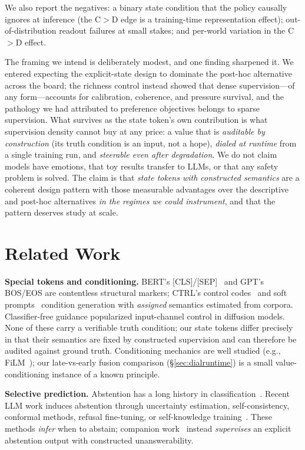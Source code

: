 \documentclass[11pt]{article}
\begin{document}
We also report the negatives: a binary state condition that the policy causally ignores at inference (the C$>$D edge is a training-time representation effect); out-of-distribution readout failures at small stakes; and per-world variation in the C$>$D effect.

The framing we intend is deliberately modest, and one finding sharpened it. We entered expecting the explicit-state design to dominate the post-hoc alternative across the board; the richness control instead showed that dense supervision---of any form---accounts for calibration, coherence, and pressure survival, and the pathology we had attributed to preference objectives belongs to sparse supervision. What survives as the state token's own contribution is what supervision density cannot buy at any price: a value that is \emph{auditable by construction} (its truth condition is an input, not a hope), \emph{dialed at runtime} from a single training run, and \emph{steerable even after degradation}. We do not claim models have emotions, that toy results transfer to LLMs, or that any safety problem is solved. The claim is that \emph{state tokens with constructed semantics} are a coherent design pattern with those measurable advantages over the descriptive and post-hoc alternatives \emph{in the regimes we could instrument}, and that the pattern deserves study at scale.

\section{Related Work}
\label{sec:related}

\textbf{Special tokens and conditioning.} BERT's [CLS]/[SEP]~\cite{devlin2019bert} and GPT's BOS/EOS are contentless structural markers; CTRL's control codes~\cite{keskar2019ctrl} and soft prompts~\cite{lester2021power} condition generation with \emph{assigned} semantics estimated from corpora. Classifier-free guidance popularized input-channel control in diffusion models. None of these carry a verifiable truth condition; our state tokens differ precisely in that their semantics are fixed by constructed supervision and can therefore be audited against ground truth. Conditioning mechanics are well studied (e.g., FiLM~\cite{perez2018film}); our late-vs-early fusion comparison (\S\ref{sec:dialruntime}) is a small value-conditioning instance of a known principle.

\textbf{Selective prediction.} Abstention has a long history in classification~\cite{chow1970optimum,geifman2017selective}. Recent LLM work induces abstention through uncertainty estimation, self-consistency, conformal methods, refusal fine-tuning, or self-knowledge training~\cite{kalai2025why,kuhn2023semantic,lin2024conformal,zhang2024rtuning,kadavath2022know}. These methods \emph{infer} when to abstain; companion work~\cite{kanber2026abstain} instead \emph{supervises} an explicit abstention output with constructed unanswerability.
\end{document}
